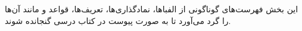 \documentclass[../../include/open-logic-part]{subfiles}
\begin{document}

\begin{editorial}
  این بخش فهرست‌های گوناگونی از الفباها، نمادگذاری‌ها، تعریف‌ها، قواعد و
  مانند آن‌ها را گرد می‌آورد تا به صورت پیوست در کتاب درسی گنجانده شوند.
\end{editorial}



\OLEndPartHook
\end{document}
